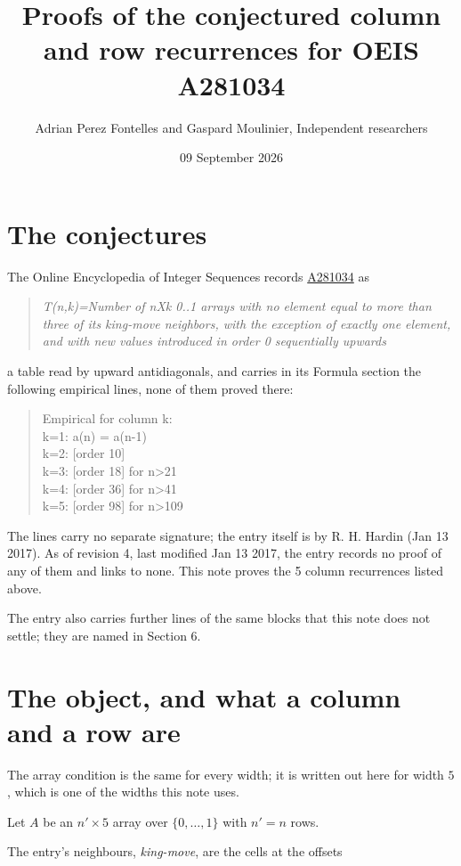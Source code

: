 \documentclass[11pt]{article}
\title{Proofs of the conjectured column and row recurrences for OEIS A281034}
\author{Adrian Perez Fontelles and Gaspard Moulinier, Independent researchers}
\date{09 September 2026}
\theoremstyle{definition}
\begin{document}
\maketitle
\section{The conjectures}

The Online Encyclopedia of Integer Sequences records \href{https://oeis.org/A281034}{A281034} as

\begin{quote}\itshape T(n,k)=Number of nXk 0..1 arrays with no element equal to more than three of its king-move neighbors, with the exception of exactly one element, and with new values introduced in order 0 sequentially upwards\end{quote}

a table read by upward antidiagonals, and carries in its Formula section the following empirical lines, none of them proved there:

\begin{quote}\ttfamily Empirical for column k:\\
k=1: a(n) = a(n-1)\\k=2: [order 10]\\k=3: [order 18] for n>21\\k=4: [order 36] for n>41\\k=5: [order 98] for n>109\end{quote}

The lines carry no separate signature; the entry itself is by R. H. Hardin (Jan 13 2017). As of revision 4, last modified Jan 13 2017, the entry records no proof of any of them and links to none. This note proves the 5 column recurrences listed above.

The entry also carries further lines of the same blocks that this note does not settle; they are named in Section 6.

\section{The object, and what a column and a row are}

The array condition is the same for every width; it is written out here for width $5$, which is one of the widths this note uses.

Let $A$ be an $n' \times 5$ array over $\{0,\dots,1\}$ with $n' = n$ rows.

The entry's neighbours, {\itshape king-move}, are the cells at the offsets
\end{document}
